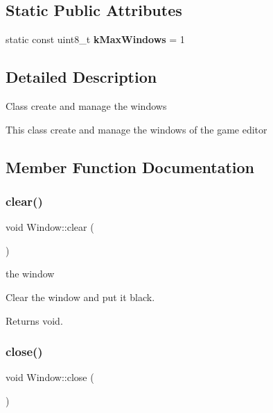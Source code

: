 \subsection*{Static Public Attributes}
\begin{DoxyCompactItemize}
\item 
\mbox{\label{class_window_adddb1eb449be45c372249dc1462c4e68}} 
static const uint8\+\_\+t {\bfseries k\+Max\+Windows} = 1
\end{DoxyCompactItemize}


\subsection{Detailed Description}
Class create and manage the windows

This class create and manage the windows of the game editor 

\subsection{Member Function Documentation}
\mbox{\label{class_window_a38bc43bdd1a97e5de7f346ba4c3957ef}} 
\subsubsection{\texorpdfstring{clear()}{clear()}}
{\footnotesize\ttfamily void Window\+::clear (\begin{DoxyParamCaption}{ }\end{DoxyParamCaption})}

the window

Clear the window and put it black.

\begin{DoxyReturn}{Returns}
void. 
\end{DoxyReturn}
\mbox{\label{class_window_a35055c04498121d39741bfcd5082705b}} 
\subsubsection{\texorpdfstring{close()}{close()}}
{\footnotesize\ttfamily void Window\+::close (\begin{DoxyParamCaption}{ }\end{DoxyParamCaption})}

